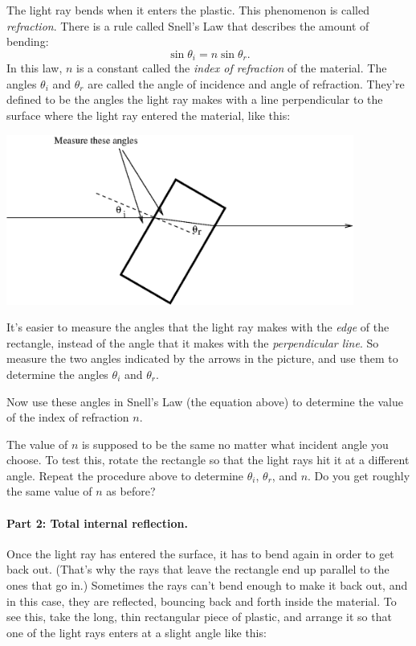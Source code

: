 The light ray bends when it enters the plastic.  This phenomenon is
called {\it refraction}.  There is a rule called Snell's Law that
describes the amount of bending:
$$
\sin\theta_i=n\sin\theta_r.
$$
In this law, $n$ is a constant called the {\it index of refraction} of 
the material.  The angles $\theta_i$ and $\theta_r$ are called the
angle of incidence and angle of refraction.  They're defined to be the
angles the light ray makes with a line perpendicular to the surface
where the light ray entered the material, like this:

\answerspace{0.1in}
\centerline{\includegraphics[width=4.5in]{lenses1/lensfig3.eps}}

It's easier to measure the angles that the light ray makes with
the \textit{edge} of the rectangle, instead of the angle that it makes with
the \textit{perpendicular line}.  So measure the two angles
indicated by the arrows in the picture, and use them
to determine the angles $\theta_i$ and $\theta_r$.

\answerspace{1.5in}

Now use these angles in Snell's Law (the equation above) to determine
the value of the index of refraction $n$.

\answerspace{1.5in}

The value of $n$ is supposed to be the same no matter what incident angle
you choose.  To test this, rotate the rectangle so that the light
rays hit it at a different angle.  Repeat the procedure above to determine
$\theta_i$, $\theta_r$, and $n$.  Do you get roughly the same value of $n$ as
before?

\answerspace{3.0in}

\paragraph{Part 2: Total internal reflection.}
Once the light ray has entered the surface, it has to bend again
in order to get back out.  (That's why the rays that leave the rectangle
end up parallel to the ones that go in.)  Sometimes the rays can't bend
enough to make it back out, and in this case, they are reflected, bouncing
back and forth inside the material.  To see this, take the long, thin
rectangular piece of plastic, and arrange it so that one of the light
rays enters at a slight angle like this:

